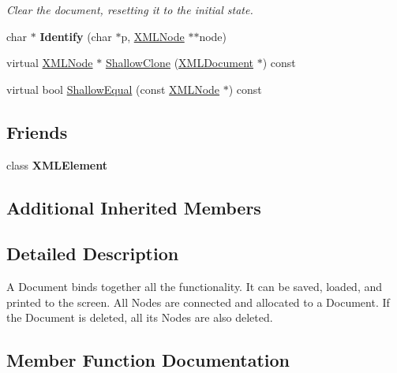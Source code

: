 \begin{DoxyCompactItemize}
\begin{DoxyCompactList}\small\item\em Clear the document, resetting it to the initial state. \end{DoxyCompactList}\item 
char $\ast$ {\bfseries Identify} (char $\ast$p, \hyperlink{classtinyxml2_1_1_x_m_l_node}{X\+M\+L\+Node} $\ast$$\ast$node)\hypertarget{classtinyxml2_1_1_x_m_l_document_a25827d1bec509ad566a107e5853ed040}{}\label{classtinyxml2_1_1_x_m_l_document_a25827d1bec509ad566a107e5853ed040}

\item 
virtual \hyperlink{classtinyxml2_1_1_x_m_l_node}{X\+M\+L\+Node} $\ast$ \hyperlink{classtinyxml2_1_1_x_m_l_document_a57c8511ed9f83aa3e20909a3db3f83d0}{Shallow\+Clone} (\hyperlink{classtinyxml2_1_1_x_m_l_document}{X\+M\+L\+Document} $\ast$) const 
\item 
virtual bool \hyperlink{classtinyxml2_1_1_x_m_l_document_a12eac66c6e45d074d5cc47319868cd66}{Shallow\+Equal} (const \hyperlink{classtinyxml2_1_1_x_m_l_node}{X\+M\+L\+Node} $\ast$) const 
\end{DoxyCompactItemize}
\subsection*{Friends}
\begin{DoxyCompactItemize}
\item 
class {\bfseries X\+M\+L\+Element}\hypertarget{classtinyxml2_1_1_x_m_l_document_ac2fba9b6e452829dd892f7392c24e0eb}{}\label{classtinyxml2_1_1_x_m_l_document_ac2fba9b6e452829dd892f7392c24e0eb}

\end{DoxyCompactItemize}
\subsection*{Additional Inherited Members}


\subsection{Detailed Description}
A Document binds together all the functionality. It can be saved, loaded, and printed to the screen. All Nodes are connected and allocated to a Document. If the Document is deleted, all its Nodes are also deleted. 

\subsection{Member Function Documentation}

